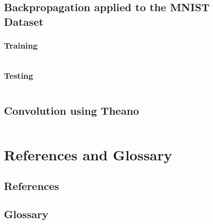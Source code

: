 \documentclass[a4paper,twoside,10pt]{article}
\begin{document}
\subsection{Backpropagation applied to the MNIST Dataset}\label{app:mnistbackprop}
\subsubsection{Training}
\inputminted[frame=lines,linenos,fontsize=\small]{python}{mnist-backprop.py}
\subsubsection{Testing}
\inputminted[frame=lines,linenos,fontsize=\small]{python}{mnist-run.py}

\subsection{Convolution using Theano}
\inputminted[frame=lines,linenos,fontsize=\small]{python}{convolution.py}

\section{References and Glossary}
\subsection{References}
\printbibliography[heading=none]

\subsection{Glossary}
\begin{acronym}[L-BFGS]
\end{acronym}
\end{document}
